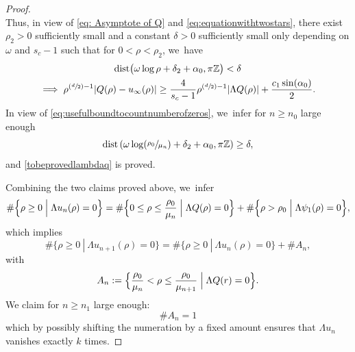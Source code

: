 \documentclass[JEP,XML,SOM,Unicode]{cedram}
\newcommand{\Psfrac}[2]{(\sfrac{#1}{#2})}
\theoremstyle{plain}
\theoremstyle{definition}
\begin{document}
\begin{proof}
\[\]
Thus, in view of \eqref{eq: Asymptote of Q} and \eqref{eq:equationwithtwostars}, there exist $\rho_2>0$ sufficiently small and a constant $\delta>0$ sufficiently small only depending on $\omega$ and $s_c-1$ such that for $0<\rho<\rho_2$, we~have
\begin{multline*}
\textrm{dist}\big(\omega\log\rho+\delta_2+\alpha_0, \pi\mathbb{Z}\big)<\delta\\
\implies \rho^{\Psfrac{d}{2}-1}|Q(\rho) - u_\infty(\rho)|\geq \frac{4}{s_c-1}\rho^{\Psfrac{d}{2}-1}|\Lambda Q(\rho)|+\frac{c_1\sin(\alpha_0)}{2}.
\end{multline*}
In view of \eqref{eq:usefulboundtocountnumberofzeros}, we~infer for $n\ge n_0$ large enough
\begin{equation}\label{eq:equationwithonestar}
\textrm{dist}\left(\omega\log(\sfrac{\rho_0}{\mu_n})+\delta_2+\alpha_0, \pi\mathbb{Z}\right)\geq \delta,
\end{equation}
and \eqref{tobeprovedlambdaq} is proved.

Combining the two claims proved above, we~infer
\[
\#\Big\{\rho\geq 0\Bigm|\Lambda u_n(\rho)=0\Big\}
= \#\Big\{0\leq \rho\leq \frac{\rho_0}{\mu_n}\Bigm|\Lambda Q(\rho)=0 \Big\}+ \#\Big\{\rho>\rho_0\Bigm|\Lambda\psi_1(\rho)=0\Big\},
\]
which implies
\[
\#\{\rho\geq 0 \ | \ \Lambda u_{n+1}(\rho)=0\} = \#\{\rho\geq 0 \ | \ \Lambda u_n(\rho)=0\} + \# A_n,
\]
with
\[
A_n := \Big\{\frac{\rho_0}{\mu_n}< \rho\leq \frac{\rho_0}{\mu_{n+1}}\Bigm|\Lambda Q(r)=0 \Big\}.
\]
We claim for $n\geq n_1$ large enough:
\begin{equation}
\label{estcarajo}
\# A_n=1
\end{equation}
which by possibly shifting the numeration by a fixed amount ensures that $\Lambda u_n$ vanishes exactly $k$ times.


\end{proof}
\end{document}
